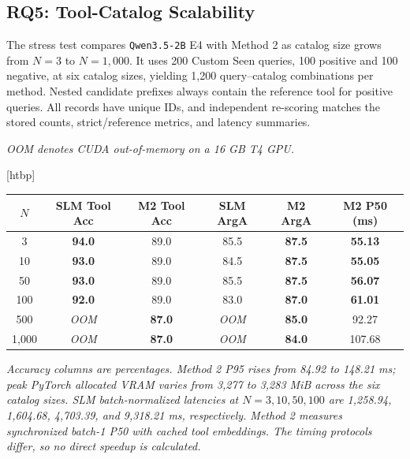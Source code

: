 \documentclass[10pt,twocolumn,a4paper]{article}
\makeatletter
\renewenvironment{table}{\@dblfloat{table}}{\end@dblfloat}
\newcommand{\tabletext}{\small}
\makeatother
\begin{document}
\subsection{RQ5: Tool-Catalog Scalability}
The stress test compares \texttt{Qwen3.5-2B} E4 with Method 2 as catalog size grows from $N=3$ to $N=1{,}000$. It uses 200 Custom Seen queries, 100 positive and 100 negative, at six catalog sizes, yielding 1,200 query--catalog combinations per method. Nested candidate prefixes always contain the reference tool for positive queries. All records have unique IDs, and independent re-scoring matches the stored counts, strict/reference metrics, and latency summaries.

\textit{OOM denotes CUDA out-of-memory on a 16 GB T4 GPU.}

\begin{table}[htbp]
    \centering
    \caption{Stress-test results for Method 1 and Method 2 ($N=3$ to $1{,}000$ tools).}
    \label{tab:stress-test}
    \tabletext
    \begin{tabular*}{\textwidth}{@{\extracolsep{\fill}}cccccc@{}}
        \toprule
        \textbf{$N$} & \textbf{SLM Tool Acc} & \textbf{M2 Tool Acc} & \textbf{SLM ArgA} & \textbf{M2 ArgA} & \textbf{M2 P50 (ms)} \\
        \midrule
        3 & \textbf{94.0} & 89.0 & 85.5 & \textbf{87.5} & \textbf{55.13} \\
        10 & \textbf{93.0} & 89.0 & 84.5 & \textbf{87.5} & \textbf{55.05} \\
        50 & \textbf{93.0} & 89.0 & 85.5 & \textbf{87.5} & \textbf{56.07} \\
        100 & \textbf{92.0} & 89.0 & 83.0 & \textbf{87.0} & \textbf{61.01} \\
        500 & \textit{OOM} & \textbf{87.0} & \textit{OOM} & \textbf{85.0} & 92.27 \\
        1,000 & \textit{OOM} & \textbf{87.0} & \textit{OOM} & \textbf{84.0} & 107.68 \\
        \bottomrule
    \end{tabular*}
\end{table}

\textit{Accuracy columns are percentages. Method 2 P95 rises from 84.92 to 148.21 ms; peak PyTorch allocated VRAM varies from 3,277 to 3,283 MiB across the six catalog sizes. SLM batch-normalized latencies at $N=3,10,50,100$ are 1,258.94, 1,604.68, 4,703.39, and 9,318.21 ms, respectively. Method 2 measures synchronized batch-1 P50 with cached tool embeddings. The timing protocols differ, so no direct speedup is calculated.}
\end{document}
